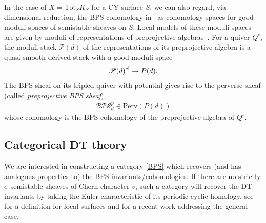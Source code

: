 \documentclass [11pt,oneside,a4paper,mathscr]{amsart}
\theoremstyle{definition}
\begin{document}
In the case of 
$X=\mathrm{Tot}_SK_S$
for a CY surface $S$, 
we can also regard, via dimensional reduction, the BPS cohomology in~\cite{DHSM}
as cohomology spaces for good moduli spaces of 
semistable sheaves on $S$. 
Local models of these moduli spaces are given by moduli of representations of preprojective algebras~\cite{Sacca0, DavPurity}. 
For a quiver $Q^{\circ}$,
the moduli stack $\mathscr{P}(d)$ of the representations of its preprojective algebra is a quasi-smooth derived stack 
with a good moduli space \[\mathscr{P}(d)^{\rm{cl}} \to P(d).\] 
The BPS sheaf on its tripled quiver with potential 
gives rise to the perverse sheaf (called \textit{preprojective BPS sheaf})
\begin{align*}
    \mathcal{BPS}^p_d\in \mathrm{Perv}(P(d))
\end{align*}
 whose cohomology is the BPS cohomology of the preprojective algebra of $Q^\circ$.
 
 
 


\subsection{Categorical DT theory}

We are interested in constructing a category \eqref{BPS} which recovers (and has analogous properties to) the BPS invariants/cohomologies. If there are no strictly $\sigma$-semistable sheaves of Chern character $v$, such a category will recover the DT invariants by taking the Euler characteristic of its periodic cyclic homology, see \cite{T} for a definition for local surfaces and \cite{RHH} for a recent work addressing the general case.



\end{document}
